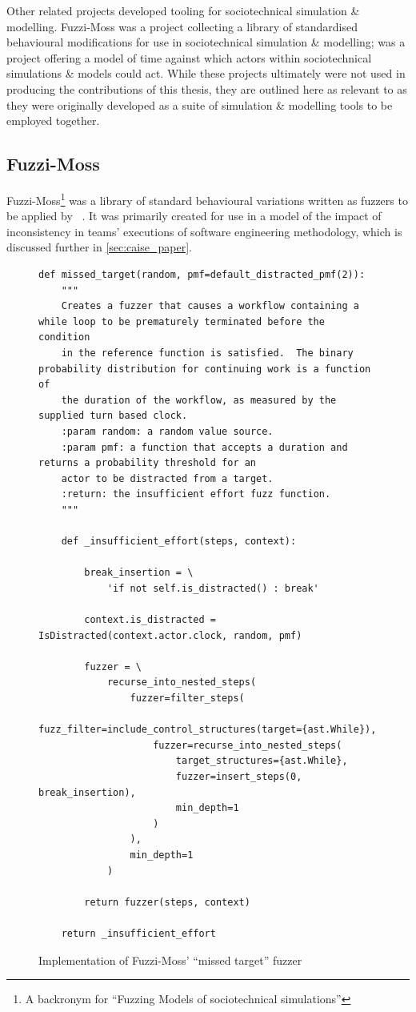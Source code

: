 Other related projects developed tooling for sociotechnical simulation \&
modelling. Fuzzi-Moss was a project collecting a library of standardised
behavioural modifications for use in sociotechnical simulation \& modelling;
\theatreag{} was a project offering a model of time against which actors within
sociotechnical simulations \& models could act. While these projects ultimately
were not used in producing the contributions of this thesis, they are outlined
here as relevant to \pydysofu as they were originally developed as a suite of
simulation \& modelling tools to be employed together.

\subsection{Fuzzi-Moss}\label{subsec:prior_work_fm}

Fuzzi-Moss\footnote{A backronym for ``Fuzzing Models of sociotechnical
simulations''} was a library of standard behavioural variations written as
fuzzers to be applied by \pydysofu{}~\cite{fuzzimoss_repo}. It was primarily created
for use in a model of the impact of inconsistency in teams' executions of
software engineering methodology, which is discussed further in
\cref{sec:caise_paper}.

\begin{figure}
    \begin{lstlisting}[style=footnotesize_python]
def missed_target(random, pmf=default_distracted_pmf(2)):
    """
    Creates a fuzzer that causes a workflow containing a while loop to be prematurely terminated before the condition
    in the reference function is satisfied.  The binary probability distribution for continuing work is a function of
    the duration of the workflow, as measured by the supplied turn based clock.
    :param random: a random value source.
    :param pmf: a function that accepts a duration and returns a probability threshold for an
    actor to be distracted from a target.
    :return: the insufficient effort fuzz function.
    """

    def _insufficient_effort(steps, context):

        break_insertion = \
            'if not self.is_distracted() : break'

        context.is_distracted = IsDistracted(context.actor.clock, random, pmf)

        fuzzer = \
            recurse_into_nested_steps(
                fuzzer=filter_steps(
                    fuzz_filter=include_control_structures(target={ast.While}),
                    fuzzer=recurse_into_nested_steps(
                        target_structures={ast.While},
                        fuzzer=insert_steps(0, break_insertion),
                        min_depth=1
                    )
                ),
                min_depth=1
            )

        return fuzzer(steps, context)

    return _insufficient_effort
    \end{lstlisting}
    \caption{Implementation of Fuzzi-Moss' ``missed target'' fuzzer}
    \label{fig:fuzzimoss_missed_target_fuzzer}
\end{figure}


